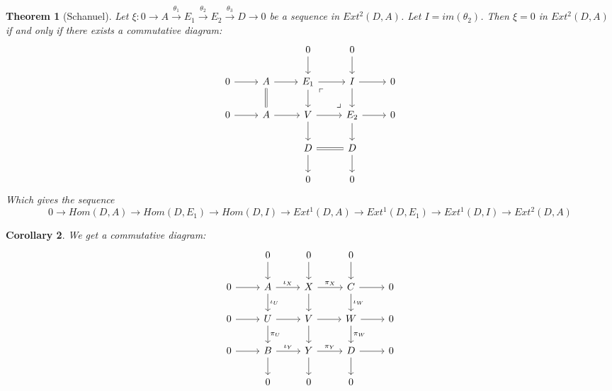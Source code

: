 \documentclass{book}
\newtheorem{theorem}{Theorem}[section]
\newtheorem{corollary}[theorem]{Corollary}
\begin{document}
\begin{theorem}[Schanuel]
Let $ \xi : 0 \rightarrow A \xrightarrow{\theta_1} E_1 \xrightarrow{\theta_2} E_2 \xrightarrow{\theta_3} D \rightarrow 0 $ be a sequence in $Ext^2(D,A)$. Let $I=im(\theta_2)$. Then $\xi =0$ in $Ext^2(D,A)$ if and only if there exists a commutative diagram: 
$$\begin{tikzcd}
            &&0 \arrow{d}&0\arrow{d}& \\ 
	0 \arrow{r}  & A \arrow{r} \arrow[d,equal]  & E_1 \arrow{r} \arrow{d} \arrow[dr, phantom, "\ulcorner", very near start  ]  \arrow[dr, phantom, "\lrcorner", very near end  ]& I \arrow{r} \arrow[d]   &0  \\ 
           0 \arrow{r}  & A \arrow{r}  & V \arrow{r} \arrow{d}  & E_2 \arrow{r} \arrow[d]   &0  \\ 
	&&D \arrow[r,equal] \arrow{d}&D\arrow{d}&\\
          &&0&0&
            \end{tikzcd}$$
Which gives the sequence $$ 0 \rightarrow Hom(D,A) \rightarrow Hom(D,E_1) \rightarrow Hom(D,I) \rightarrow Ext^1(D,A) \rightarrow Ext^1(D,E_1) \rightarrow Ext^1(D,I) \rightarrow Ext^2(D,A) $$
\end{theorem}

\begin{corollary}
We get a commutative diagram:
 \[\begin{tikzcd}
             &  0\arrow{d}& 0\arrow{d} &0\arrow{d} &  \\
	0 \arrow{r} & A \arrow{r}{\iota_X} \arrow{d}{\iota_U}& X\arrow{d} \arrow{r}{\pi_X}& C\arrow{r}\arrow{d}{\iota_W}& 0 \\
	0\arrow{r}& U\arrow{d}{\pi_U} \arrow{r} & V \arrow{r} \arrow{d} & W\arrow{r} \arrow{d}{\pi_W}& 0 \\
           0 \arrow{r} & B \arrow{r}{\iota_Y} \arrow{d}& Y \arrow{d} \arrow{r}{\pi_Y}& D\arrow{r}\arrow{d}& 0 \\
	& 0 & 0& 0&  
            \end{tikzcd}\]
\end{corollary}
\end{document}
